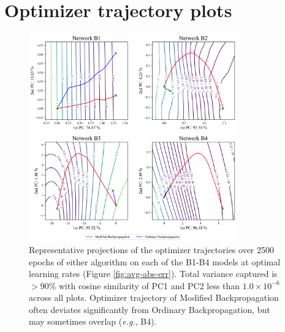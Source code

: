 \documentclass{article}
\theoremstyle{plain}
\theoremstyle{definition}
\theoremstyle{remark}
\begin{document}
\section{Optimizer trajectory plots}
\label{app:pca}
\begin{figure}[H]
    \centering
    \includegraphics[width=0.8\textwidth]{./resources/pca_all.png}
    \caption{Representative projections of the optimizer trajectories over 2500 epochs of either algorithm on each of the B1-B4 models at optimal learning rates (Figure \ref{fig:avg-abs-err}). Total variance captured is $>90\%$ with cosine similarity of PC1 and PC2 less than $1.0\times10^{-6}$ across all plots. Optimizer trajectory of Modified Backpropagation often deviates significantly from Ordinary Backpropagation, but may sometimes overlap (\textit{e.g.}, B4).}
    \label{fig:big-pca}
\end{figure}
\end{document}
